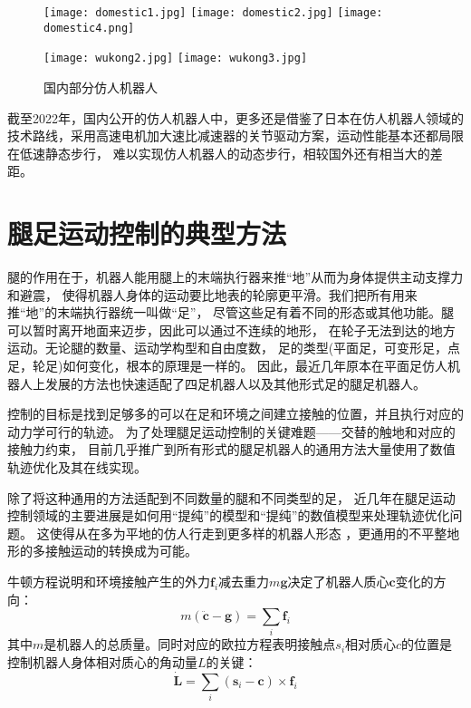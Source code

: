 \begin{figure}[htbp]
    \centering
        {%
            \texttt{[image: domestic1.jpg]}}
        {%
            \texttt{[image: domestic2.jpg]}}
        {%
            \texttt{[image: domestic4.png]}}     
    
        {%
            \texttt{[image: wukong2.jpg]}}
        {%
            \texttt{[image: wukong3.jpg]}}            
    \caption{国内部分仿人机器人\label{fig:domes_biped}}
\end{figure}
截至2022年，国内公开的仿人机器人中，更多还是借鉴了日本在仿人机器人领域的技术路线，采用高速电机加大速比减速器的关节驱动方案，运动性能基本还都局限在低速静态步行，
难以实现仿人机器人的动态步行，相较国外还有相当大的差距。
\section{腿足运动控制的典型方法}
腿的作用在于，机器人能用腿上的末端执行器来推“地”从而为身体提供主动支撑力和避震，
使得机器人身体的运动要比地表的轮廓更平滑。我们把所有用来推“地”的末端执行器统一叫做“足”，
尽管这些足有着不同的形态或其他功能。腿可以暂时离开地面来迈步，因此可以通过不连续的地形，
在轮子无法到达的地方运动。无论腿的数量、运动学构型和自由度数，
足的类型(平面足，可变形足，点足，轮足)如何变化，根本的原理是一样的。
因此，最近几年原本在平面足仿人机器人上发展的方法也快速适配了四足机器人以及其他形式足的腿足机器人。

控制的目标是找到足够多的可以在足和环境之间建立接触的位置，并且执行对应的动力学可行的轨迹。
为了处理腿足运动控制的关键难题——交替的触地和对应的接触力约束，
目前几乎推广到所有形式的腿足机器人的通用方法大量使用了数值轨迹优化及其在线实现。

除了将这种通用的方法适配到不同数量的腿和不同类型的足，
近几年在腿足运动控制领域的主要进展是如何用“提纯”的模型和“提纯”的数值模型来处理轨迹优化问题。
这使得从在多为平地的仿人行走到更多样的机器人形态
，更通用的不平整地形的多接触运动的转换成为可能。

牛顿方程说明和环境接触产生的外力$\boldsymbol{f}_i$减去重力$m\boldsymbol{g}$决定了机器人质心$\boldsymbol{c}$变化的方向：
\begin{equation}
    \label{equ:newton}
    m(\ddot{\boldsymbol{c}}-\boldsymbol{g})=\sum_i \boldsymbol{f}_i
\end{equation}
其中$m$是机器人的总质量。同时对应的欧拉方程表明接触点$s_i$相对质心$c$的位置是控制机器人身体相对质心的角动量$L$的关键：
\begin{equation}
    \label{equ:euler}
    \dot{\boldsymbol{L}}=\sum_i\left(\boldsymbol{s}_i-\boldsymbol{c}\right) \times \boldsymbol{f}_i
\end{equation}

